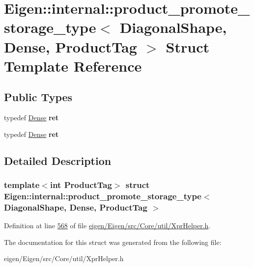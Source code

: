\hypertarget{struct_eigen_1_1internal_1_1product__promote__storage__type_3_01_diagonal_shape_00_01_dense_00_01_product_tag_01_4}{}\section{Eigen\+:\+:internal\+:\+:product\+\_\+promote\+\_\+storage\+\_\+type$<$ Diagonal\+Shape, Dense, Product\+Tag $>$ Struct Template Reference}
\label{struct_eigen_1_1internal_1_1product__promote__storage__type_3_01_diagonal_shape_00_01_dense_00_01_product_tag_01_4}
\subsection*{Public Types}
\begin{DoxyCompactItemize}
\item 
\mbox{\label{struct_eigen_1_1internal_1_1product__promote__storage__type_3_01_diagonal_shape_00_01_dense_00_01_product_tag_01_4_a4934f44fe4b8fd3ea78b8301fa85ac01}} 
typedef \hyperlink{struct_eigen_1_1_dense}{Dense} {\bfseries ret}
\item 
\mbox{\label{struct_eigen_1_1internal_1_1product__promote__storage__type_3_01_diagonal_shape_00_01_dense_00_01_product_tag_01_4_a4934f44fe4b8fd3ea78b8301fa85ac01}} 
typedef \hyperlink{struct_eigen_1_1_dense}{Dense} {\bfseries ret}
\end{DoxyCompactItemize}


\subsection{Detailed Description}
\subsubsection*{template$<$int Product\+Tag$>$\newline
struct Eigen\+::internal\+::product\+\_\+promote\+\_\+storage\+\_\+type$<$ Diagonal\+Shape, Dense, Product\+Tag $>$}



Definition at line \hyperlink{eigen_2_eigen_2src_2_core_2util_2_xpr_helper_8h_source_l00568}{568} of file \hyperlink{eigen_2_eigen_2src_2_core_2util_2_xpr_helper_8h_source}{eigen/\+Eigen/src/\+Core/util/\+Xpr\+Helper.\+h}.



The documentation for this struct was generated from the following file\+:\begin{DoxyCompactItemize}
\item 
eigen/\+Eigen/src/\+Core/util/\+Xpr\+Helper.\+h\end{DoxyCompactItemize}
